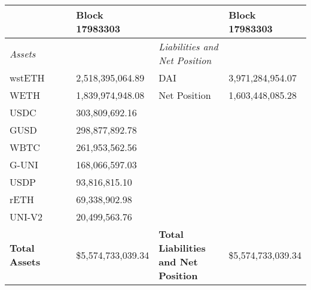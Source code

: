
\begin{longtable}{@{}p{0.25\linewidth}p{0.25\linewidth}p{0.25\linewidth}p{0.25\linewidth}@{}}

\toprule


& Block 17983303 & & Block 17983303 \\

\midrule
\textit{Assets} & & \textit{Liabilities and Net Position} \\
wstETH & 2,518,395,064.89 & DAI &3,971,284,954.07 \\
WETH & 1,839,974,948.08 & Net Position &1,603,448,085.28 \\
USDC & 303,809,692.16 & & \\
GUSD & 298,877,892.78 & & \\
WBTC & 261,953,562.56 & & \\
G-UNI & 168,066,597.03 & & \\
USDP & 93,816,815.10 & & \\
rETH & 69,338,902.98 & & \\
UNI-V2 & 20,499,563.76 & & \\

\midrule

\textbf{Total Assets} & \$5,574,733,039.34 & \textbf{Total Liabilities and Net Position} & \$5,574,733,039.34 \\

\bottomrule

\end{longtable}
